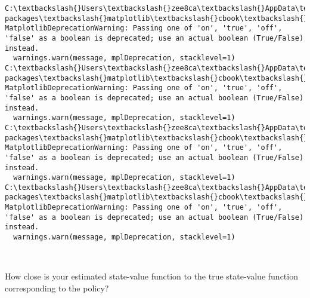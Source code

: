 \documentclass[11pt]{article}
\begin{document}
    
    \begin{Verbatim}[commandchars=\\\{\}]
C:\textbackslash{}Users\textbackslash{}zee8ca\textbackslash{}AppData\textbackslash{}Local\textbackslash{}Continuum\textbackslash{}anaconda3\textbackslash{}lib\textbackslash{}site-packages\textbackslash{}matplotlib\textbackslash{}cbook\textbackslash{}deprecation.py:107: MatplotlibDeprecationWarning: Passing one of 'on', 'true', 'off', 'false' as a boolean is deprecated; use an actual boolean (True/False) instead.
  warnings.warn(message, mplDeprecation, stacklevel=1)
C:\textbackslash{}Users\textbackslash{}zee8ca\textbackslash{}AppData\textbackslash{}Local\textbackslash{}Continuum\textbackslash{}anaconda3\textbackslash{}lib\textbackslash{}site-packages\textbackslash{}matplotlib\textbackslash{}cbook\textbackslash{}deprecation.py:107: MatplotlibDeprecationWarning: Passing one of 'on', 'true', 'off', 'false' as a boolean is deprecated; use an actual boolean (True/False) instead.
  warnings.warn(message, mplDeprecation, stacklevel=1)
C:\textbackslash{}Users\textbackslash{}zee8ca\textbackslash{}AppData\textbackslash{}Local\textbackslash{}Continuum\textbackslash{}anaconda3\textbackslash{}lib\textbackslash{}site-packages\textbackslash{}matplotlib\textbackslash{}cbook\textbackslash{}deprecation.py:107: MatplotlibDeprecationWarning: Passing one of 'on', 'true', 'off', 'false' as a boolean is deprecated; use an actual boolean (True/False) instead.
  warnings.warn(message, mplDeprecation, stacklevel=1)
C:\textbackslash{}Users\textbackslash{}zee8ca\textbackslash{}AppData\textbackslash{}Local\textbackslash{}Continuum\textbackslash{}anaconda3\textbackslash{}lib\textbackslash{}site-packages\textbackslash{}matplotlib\textbackslash{}cbook\textbackslash{}deprecation.py:107: MatplotlibDeprecationWarning: Passing one of 'on', 'true', 'off', 'false' as a boolean is deprecated; use an actual boolean (True/False) instead.
  warnings.warn(message, mplDeprecation, stacklevel=1)

    \end{Verbatim}

    \begin{center}
    \end{center}
    { \hspace*{\fill} \\}
    
    How close is your estimated state-value function to the true state-value
function corresponding to the policy?
\end{document}
